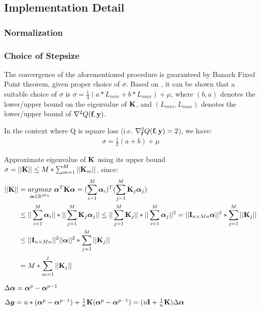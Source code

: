 \documentclass[tablecaption=bottom,wcp]{jmlr} %
\begin{document}
\subsection{Implementation Detail}
\subsubsection{Normalization}



\subsubsection{Choice of Stepsize}

The convergence of the aforementioned procedure is guaranteed by Banach Fixed Point theorem, given proper choice of $\sigma$. Based on \citet{jordan-mkl-2004}, it can be shown that a suitable choice of $\sigma$ is $\sigma = \frac{1}{4}(a*L_{min} + b*L_{max}) + \mu$, where $(b, a)$ denotes the lower/upper bound on the eigenvalue of ${\bf K}$, and $(L_{min}, L_{max})$ denotes the lower/upper bound of $\nabla^2 Q(\textbf{f}, {\bf y})$.

In the context where  Q is square loss (i.e. $\nabla^2_{\textbf{f}} Q(\textbf{f}, {\bf y}) = 2$), we have:
\begin{align*}
\sigma = \frac{1}{2}(a + b) + \mu
\end{align*}

Approximate eigenvalue of ${\bf K}$ using its upper bound 
$\sigma = ||{\bf K}|| \leq M*\sum_{m=1}^M ||{\bf K}_m||$, since:
\begin{align*}
||{\bf K}|| &= \underset{\boldsymbol{\alpha} \in {\mathbb R}^{Mn}}{argmax} \;
\boldsymbol{\alpha}^T {\bf K} \boldsymbol{\alpha} 
= (\sum_{i=1}^M \boldsymbol{\alpha}_i)^T 
(\sum_{j=1}^M {\bf K}_j \boldsymbol{\alpha}_j) \\
& \leq ||\sum_{i=1}^M \boldsymbol{\alpha}_i|| * ||\sum_{j=1}^M {\bf K}_j \boldsymbol{\alpha}_j|| 
\leq ||\sum_{j=1}^M {\bf K}_j || * ||\sum_{i=1}^M  \boldsymbol{\alpha}_j||^2 
=  ||{\bf I}_{n \times Mn}  \boldsymbol{\alpha}||^2 * \sum_{j=1}^M  ||{\bf K}_j || \\
&\leq  ||{\bf I}_{n \times Mn} ||^2  ||\boldsymbol{\alpha}||^2 *\sum_{j=1}^M  ||{\bf K}_j || \\
& = M * \sum_{m=1}^j ||{\bf K}_j||
\end{align*}


\citet{BB-1988}

$\Delta \boldsymbol{\alpha} = \boldsymbol{\alpha}^p - \boldsymbol{\alpha}^{p-1}$

$\Delta {\mbox{\boldmath$g$}} = u * (\boldsymbol{\alpha}^p - \boldsymbol{\alpha}^{p-1}) + \frac{1}{n} {\bf K}(\boldsymbol{\alpha}^p - \boldsymbol{\alpha}^{p-1}) = 
(u{\bf I} + \frac{1}{n} {\bf K}) \Delta \boldsymbol{\alpha}$
\end{document}
